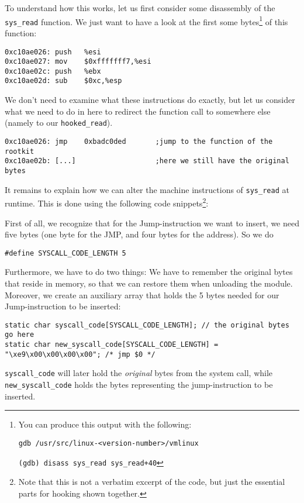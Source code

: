 \documentclass[10pt, letterpaper]{article}
\begin{document}
To understand how this works, let us first consider some disassembly of the \texttt{sys\_read} function. We just want to have a look at the first some bytes\footnote{You can produce this output with the following:

\texttt{gdb /usr/src/linux-<version-number>/vmlinux}

\texttt{(gdb) disass sys\_read\ sys\_read+40}} of this function:

\begin{verbatim}
0xc10ae026:	push   %esi
0xc10ae027:	mov    $0xfffffff7,%esi
0xc10ae02c:	push   %ebx
0xc10ae02d:	sub    $0xc,%esp
\end{verbatim}

We don't need to examine what these instructions do exactly, but let us consider what we need to do in here to redirect the function call to somewhere else (namely to our \texttt{hooked\_read}).

\begin{verbatim}
0xc10ae026:	jmp    0xbadc0ded       ;jump to the function of the rootkit
0xc10ae02b:	[...]                   ;here we still have the original bytes
\end{verbatim}

It remains to explain how we can alter the machine instructions of \texttt{sys\_read} at runtime. This is done using the following code snippets\footnote{Note that this is not a verbatim excerpt of the code, but just the essential parts for hooking shown together.}:

First of all, we recognize that for the Jump-instruction we want to insert, we need five bytes (one byte for the JMP, and four bytes for the address). So we do

\begin{verbatim}
#define SYSCALL_CODE_LENGTH 5
\end{verbatim}

Furthermore, we have to do two things: We have to remember the original bytes that reside in memory, so that we can restore them when unloading the module. Moreover, we create an auxiliary array that holds the 5 bytes needed for our Jump-instruction to be inserted:

\begin{verbatim}
static char syscall_code[SYSCALL_CODE_LENGTH]; // the original bytes go here
static char new_syscall_code[SYSCALL_CODE_LENGTH] = "\xe9\x00\x00\x00\x00"; /* jmp $0 */
\end{verbatim}


\texttt{syscall\_code} will later hold the \emph{original} bytes from the system call, while \texttt{new\_syscall\_code} holds the bytes representing the jump-instruction to be inserted. 
\end{document}
